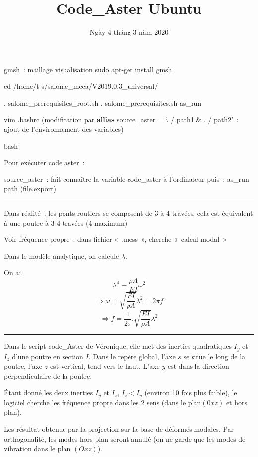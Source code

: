 \documentclass[12pt]{article}
\title{Code\_Aster Ubuntu}
\date{Ngày 4 tháng 3 năm 2020}
\begin{document}
	\maketitle

	gmsh : maillage visualisation
	sudo apt-get install gmsh
	
	cd /home/t-s/salome\_meca/V2019.0.3\_universal/
	
	. salome\_prerequisites\_root.sh 
	. salome\_prerequisites.sh 
	as\_run 
	
	vim .bashrc
	(modification par \textbf{allias} source\_aster = ‘. / path1 \& . / path2’ : ajout de l’environnement des variables)
	
	bash
	
	Pour exécuter code aster :
	
	source\_aster : fait connaître la variable code\_aster à l’ordinateur
	puis :
	as\_run path (file.export) \\
	
	\noindent\rule{18.5cm}{0.4pt}
	\linebreak
	
	Dans réalité : les ponts routiers se composent de 3 à 4 travées, cela est équivalent à une poutre à 3-4 travées (4 maximum)
	
	Voir fréquence propre : dans fichier « .mess », cherche « calcul modal »
	\linebreak
	
	Dans le modèle analytique, on calcule $\lambda$.
	
	On a:
	$$\lambda^4 = \frac{\rho A}{EI} \omega^2$$
	$$\Rightarrow \omega = \sqrt{\frac{EI}{\rho A}} \lambda ^2 = 2 \pi f $$
	$$\Rightarrow f = \frac{1}{2 \pi}.\sqrt{\frac{EI}{\rho A}} \lambda ^2 $$
	
	\noindent\rule{18.5cm}{0.4pt}
	\linebreak
	
	Dans le script code\_Aster de Véronique, elle met des inerties quadratiques $I_y$ et $I_z$ d'une poutre en section $I$. Dans le repère global, l'axe $s$ se situe le long de la poutre, l'axe $z$ est vertical, tend vers le haut. L'axe $y$ est dans la direction perpendiculaire de la poutre.
	
	Étant donné les deux inerties $I_y$ et $I_z$, $I_z < I_y$ (environ 10 fois plus faible), le logiciel cherche les fréquence propre dans les 2 sens (dans le plan$(0xz)$ et hors plan).
	
	Les résultat obtenue par la projection sur la base de déformés modales. Par orthogonalité, les modes hors plan seront annulé (on ne garde que les modes de vibration dans le plan $(Oxz)$).
	
	
\end{document}
